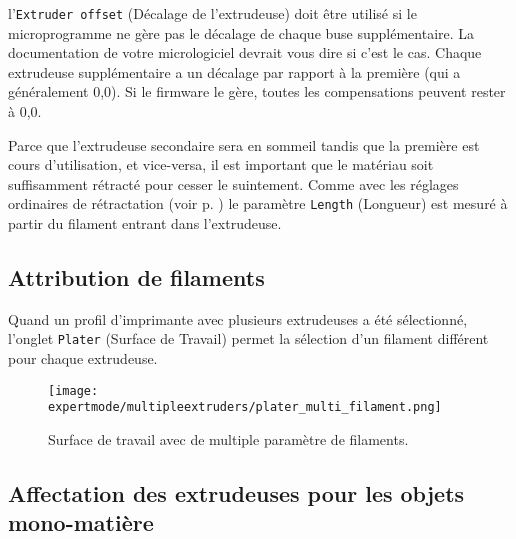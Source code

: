 
l'\texttt{Extruder offset} (D\'ecalage de l'extrudeuse) doit \^etre utilis\'e si le microprogramme ne g\`ere pas le d\'ecalage de chaque buse suppl\'ementaire. La documentation de votre micrologiciel devrait vous dire si c'est le cas. Chaque extrudeuse suppl\'ementaire a un d\'ecalage par rapport \`a la premi\`ere (qui a généralement 0,0). Si le firmware le g\`ere, toutes les compensations peuvent rester \`a 0,0.

Parce que l'extrudeuse secondaire sera en sommeil tandis que la premi\`ere est cours d'utilisation, et vice-versa, il est important que le mat\'eriau soit suffisamment r\'etract\'e pour cesser le suintement.  Comme avec les r\'eglages ordinaires de r\'etractation (voir p. \pageref{fig:retraction_settings}) le param\`etre \texttt{Length} (Longueur) est mesur\'e \`a partir du filament entrant dans l'extrudeuse.


\subsection{Attribution de filaments} %
\label{sub:assigning_filaments}
Quand un profil d'imprimante avec plusieurs extrudeuses a \'et\'e s\'electionn\'e, l'onglet \texttt{Plater} (Surface de Travail) permet la s\'election d'un filament diff\'erent pour chaque extrudeuse.

\begin{figure}[H]
\centering
\texttt{[image: expertmode/multipleextruders/plater\_multi\_filament.png]}
\caption{Surface de travail avec de multiple param\`etre de filaments.}
\label{fig:plater_multi_filament}
\end{figure}


\subsection{Affectation des extrudeuses pour les objets mono-mati\`ere} %
\label{sub:assigning_extruders}


